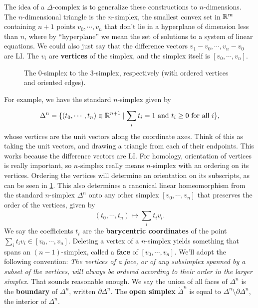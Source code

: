 The idea of a $\Delta $-complex is to generalize these constructions to $n$-dimensions. The $n$-dimensional triangle is the $n$-simplex, the smallest convex set in $\mathbb{R}^m$ containing $n+1$ points $v_0,\cdots,v_n$ that don't lie in a hyperplane of dimension less than $n$, where by ``hyperplane'' we mean the set of solutions to a system of linear equations. We could also just say that the difference vectors $v_1-v_0,\cdots,v_n-v_0$ are LI. The $v_i$ are \textbf{vertices} of the simplex, and the simplex itself is $[v_0,\cdots,v_n]$.
\begin{figure}[H]
    \centering
    \caption{The $0$-simplex to the $3$-simplex, respectively (with ordered vertices and oriented edges).}
    \label{simp}
\end{figure}
For example, we have the standard $n$-simplex given by \[
    \Delta ^n =\{(t_0,\cdots,t_n )\in \mathbb{R}^{n+1} \mid \sum_{i}^{} t_i=1 \ \text{and} \ t_i \geq 0 \ \text{for all} \ i\},
\] whose vertices are the unit vectors along the coordinate axes. Think of this as taking the unit vectors, and drawing a triangle from each of their endpoints. This works because the difference vectors are LI. For homology, orientation of vertices is really important, so $n$-simplex really means $n$-simplex with an ordering on its vertices. Ordering the vertices will determine an orientation on its subscripts, as can be seen in \cref{simp}. This also determines a canonical linear homeomorphism from the standard $n$-simplex $\Delta ^n $ onto any other simplex $[v_0,\cdots,v_n]$ that preserves the order of the vertices, given by 
\[
(t_0,\cdots,t_n )\mapsto \sum_{i}^{} t_iv_i.
\] We say the coefficients $t_i$ are the \textbf{barycentric coordinates} of the point $\sum_{i}^{} t_i v_i \in [v_0,\cdots,v_n ].$ Deleting a vertex of a $n$-simplex yields something that spans an $(n-1)$-simplex, called a \textbf{face} of $[v_0,\cdots,v_n ]$. We'll adopt the following convention:
\textit{The vertices of a face, or of any subsimplex spanned by a subset of the vertices,  will always be ordered according to their order in the larger simplex.}
That sounds reasonable enough. We say the union of all faces of $\Delta ^n $ is the \textbf{boundary} of $\Delta ^n $, written $\partial \Delta ^n $. The \textbf{open simplex} $\mathring{\Delta }^n $ is equal to $\Delta ^n \setminus \partial \Delta ^n $, the interior of $\Delta ^n $. 

